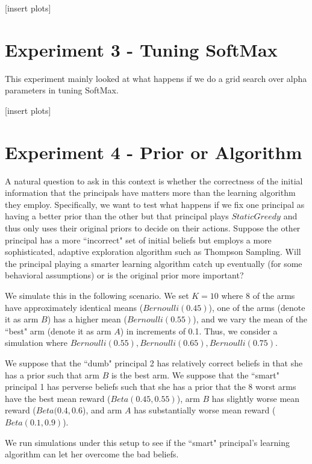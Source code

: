 \documentclass[a4paper]{article}
\begin{document}
[insert plots]

\section*{Experiment 3 - Tuning SoftMax} %
This experiment mainly looked at what happens if we do a grid search over alpha parameters in tuning SoftMax. %

[insert plots]

\section*{Experiment 4 - Prior or Algorithm}
A natural question to ask in this context is whether the correctness of the initial information that the principals have matters more than the learning algorithm they employ. Specifically, we want to test what happens if we fix one principal as having a better prior than the other but that principal plays $StaticGreedy$ and thus only uses their original priors to decide on their actions.   Suppose the other principal has a more ``incorrect" set of initial beliefs but employs a more sophisticated, adaptive exploration algorithm such as Thompson Sampling. Will the principal playing a smarter learning algorithm catch up eventually (for some behavioral assumptions) or is the original prior more important?

We simulate this in the following scenario. We set $K = 10$ where 8 of the arms have approximately identical means ($Bernoulli(0.45)$), one of the arms (denote it as arm $B$) has a higher mean ($Bernoulli(0.55)$), and we vary the mean of the ``best" arm (denote it as arm $A$) in increments of 0.1. Thus, we consider a simulation where $Bernoulli(0.55), Bernoulli(0.65), Bernoulli(0.75)$.

We suppose that the ``dumb" principal 2 has relatively correct beliefs in that she has a prior such that arm $B$ is the best arm. We suppose that the ``smart" principal 1 has perverse beliefs such that she has a prior that the 8 worst arms have the best mean reward ($Beta(0.45, 0.55)$), arm $B$ has slightly worse mean reward ($Beta(0.4, 0.6$), and arm $A$ has substantially worse mean reward ($Beta(0.1, 0.9)$).

We run simulations under this setup to see if the ``smart" principal's learning algorithm can let her overcome the bad beliefs.
\end{document}
